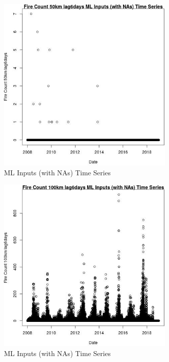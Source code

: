 \begin{figure} 
\centering  
\includegraphics[width=0.77\textwidth]{Code_Outputs/Report_ML_input_PM25_Step4_part_e_de_duplicated_aves_compiled_2019-05-21wNAs_Fire_Count_50km_lag6daysvDate.jpg} 
\caption{\label{fig:Report_ML_input_PM25_Step4_part_e_de_duplicated_aves_compiled_2019-05-21wNAsFire_Count_50km_lag6daysvDate}ML Inputs (with NAs) Time Series} 
\end{figure} 
 

\begin{figure} 
\centering  
\includegraphics[width=0.77\textwidth]{Code_Outputs/Report_ML_input_PM25_Step4_part_e_de_duplicated_aves_compiled_2019-05-21wNAs_Fire_Count_100km_lag6daysvDate.jpg} 
\caption{\label{fig:Report_ML_input_PM25_Step4_part_e_de_duplicated_aves_compiled_2019-05-21wNAsFire_Count_100km_lag6daysvDate}ML Inputs (with NAs) Time Series} 
\end{figure} 
 

